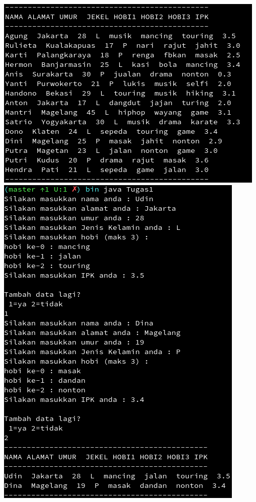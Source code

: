 \documentclass[a4paper,12pt]{article}
\begin{document}
\begin{center}
    \includegraphics[scale=.7]{lat5.png}
    \includegraphics[scale=.7]{Tugas1.png}

\end{center}
\end{document}
